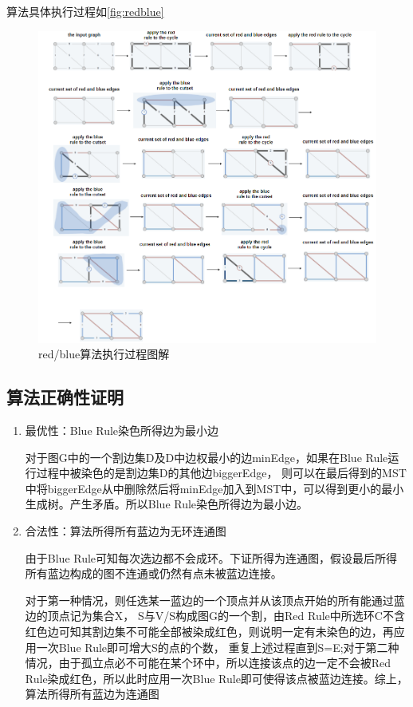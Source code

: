 算法具体执行过程如\autoref{fig:redblue}
\begin{figure}[hbt]
	\centering
	\includegraphics[scale=0.4]{image/redblue.png}
  \caption{red/blue算法执行过程图解}\label{fig:redblue}
\end{figure}

\subsection{算法正确性证明}\label{sec:redblue-proof}
\begin{enumerate}
	\item 最优性：Blue Rule染色所得边为最小边

对于图G中的一个割边集D及D中边权最小的边minEdge，如果在Blue Rule运行过程中被染色的是割边集D的其他边biggerEdge，
则可以在最后得到的MST中将biggerEdge从中删除然后将minEdge加入到MST中，可以得到更小的最小生成树。产生矛盾。所以Blue Rule染色所得边为最小边。
\item 合法性：算法所得所有蓝边为无环连通图

由于Blue Rule可知每次选边都不会成环。下证所得为连通图，假设最后所得所有蓝边构成的图不连通或仍然有点未被蓝边连接。

对于第一种情况，则任选某一蓝边的一个顶点并从该顶点开始的所有能通过蓝边的顶点记为集合X，
S与V/S构成图G的一个割，由Red Rule中所选环C不含红色边可知其割边集不可能全部被染成红色，则说明一定有未染色的边，再应用一次Blue Rule即可增大S的点的个数，
重复上述过程直到S=E;对于第二种情况，由于孤立点必不可能在某个环中，所以连接该点的边一定不会被Red Rule染成红色，所以此时应用一次Blue Rule即可使得该点被蓝边连接。综上，算法所得所有蓝边为连通图
\end{enumerate}

